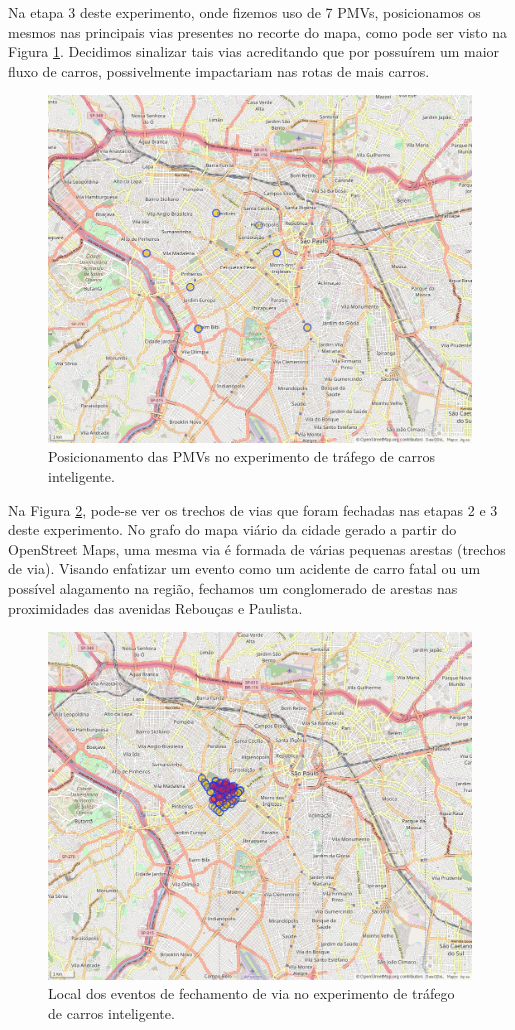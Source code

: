 Na etapa 3 deste experimento, onde fizemos uso de 7 PMVs, posicionamos os mesmos nas principais vias presentes no recorte do mapa, como pode ser visto na Figura \ref{fig:pos_pmvs}.
Decidimos sinalizar tais vias acreditando que por possuírem um maior fluxo de carros, possivelmente impactariam nas rotas de mais carros.

\begin{figure}[ht]
	\centering
	\includegraphics[width=.7\textwidth]{figuras/pmvs_locations.png}
	\caption{Posicionamento das PMVs no experimento de tráfego de carros inteligente.}
	\label{fig:pos_pmvs}
\end{figure}

Na Figura \ref{fig:eventos}, pode-se ver os trechos de vias que foram fechadas nas etapas 2 e 3 deste experimento.
No grafo do mapa viário da cidade gerado a partir do OpenStreet Maps, uma mesma via é formada de várias pequenas arestas (trechos de via).
Visando enfatizar um evento como um acidente de carro fatal ou um possível alagamento na região, fechamos um conglomerado de arestas nas proximidades das avenidas Rebouças e Paulista.

\begin{figure}[ht]
	\centering
	\includegraphics[width=.7\textwidth]{figuras/events_edges_map.png}
	\caption{Local dos eventos de fechamento de via no experimento de tráfego de carros inteligente.}
	\label{fig:eventos}
\end{figure}

